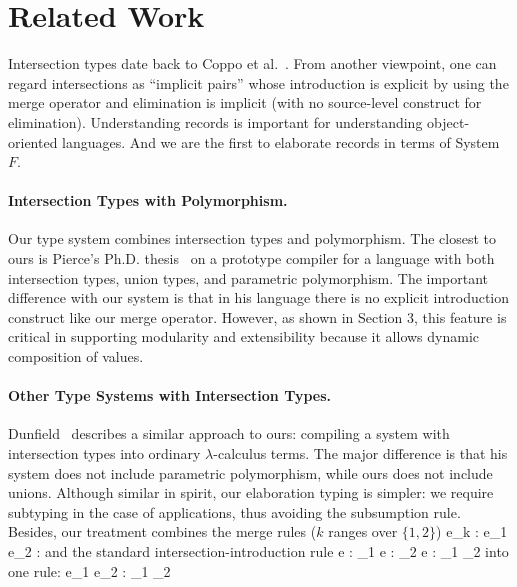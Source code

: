 \section{Related Work}




Intersection types date back to Coppo et al.~\cite{coppo1981functional}. From
another viewpoint, one can regard intersections as ``implicit pairs'' whose
introduction is explicit by using the merge operator and elimination is implicit
(with no source-level construct for elimination). Understanding records is
important for understanding object-oriented languages. And we are the first to
elaborate records in terms of System $ F $.

\cite{barbanera1995intersection}

\paragraph{Intersection Types with Polymorphism.}

Our type system combines intersection types and polymorphism. The closest to
ours is Pierce's Ph.D. thesis~\cite{pierce1991programming} on a prototype compiler for a
language with both intersection types, union types, and parametric polymorphism.
The important difference with our system is that in his language there is no
explicit introduction construct like our merge operator. However, as shown in
Section 3, this feature is critical in supporting modularity and extensibility
because it allows dynamic composition of values.

\paragraph{Other Type Systems with Intersection Types.}

Dunfield~\cite{dunfield2014elaborating} describes a similar approach to ours:
compiling a system with intersection types into ordinary $\lambda$-calculus
terms. The major difference is that his system does not include parametric
polymorphism, while ours does not include unions. Although similar in spirit,
our elaboration typing is simpler: we require subtyping in the case of
applications, thus avoiding the subsumption rule. Besides, our treatment
combines the merge rules ($ k $ ranges over $ \{1, 2\} $)
\infrule
{\Gamma \turns e_k : \ty}
{\Gamma \turns e_1 \dcomma e_2 : \ty}
and the standard intersection-introduction rule
\infrule
{\Gamma \turns e : \ty_1 \andalso \Gamma \turns e : \ty_2}
{\Gamma \turns e : \ty_1 \intersects \ty_2}
into one rule:
{\Gamma \turns e_1 \dcomma e_2 : \ty_1 \intersects \ty_2}

